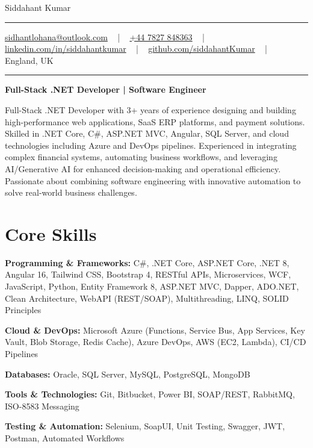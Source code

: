 \documentclass[letterpaper,10pt]{article}
\newcommand{\documentTitle}[2]{
  \begin{center}
    \vspace*{-0.3in}
    {\Huge\color{accentTitle} #1}
    \vspace{8pt}
    {\color{accentLine} \hrule}
    \vspace{2pt}
    \footnotesize{#2}
    \vspace{2pt}
    {\color{accentLine} \hrule}
  \end{center}
}
\newenvironment{resume_list}{
  \vspace{-7pt}
  \begin{itemize}[itemsep=-2px, parsep=1pt, leftmargin=30pt]
}{
  \end{itemize}
}
\begin{document}
\documentTitle{Siddahant Kumar}{
\vspace{0.1cm}
\href{mailto:sidhantlohana@outlook.com}{sidhantlohana@outlook.com} ~ | ~
\href{tel:+447827848363}{+44 7827 848363} ~ | ~
\href{https://www.linkedin.com/in/siddahantkumar/}{linkedin.com/in/siddahantkumar} ~ | ~
\href{https://github.com/siddahantKumar}{github.com/siddahantKumar} ~ | ~
England, UK
}

\begin{center}
\textbf{Full-Stack .NET Developer | Software Engineer}
\end{center}

Full-Stack .NET Developer with 3+ years of experience designing and building high-performance web applications, SaaS ERP platforms, and payment solutions. Skilled in .NET Core, C\#, ASP.NET MVC, Angular, SQL Server, and cloud technologies including Azure and DevOps pipelines. Experienced in integrating complex financial systems, automating business workflows, and leveraging AI/Generative AI for enhanced decision-making and operational efficiency. Passionate about combining software engineering with innovative automation to solve real-world business challenges.


\section{Core Skills}

\begin{resume_list}
    \item \textbf{Programming \& Frameworks:} C\#, .NET Core, ASP.NET Core, .NET 8, Angular 16, Tailwind CSS, Bootstrap 4, RESTful APIs, Microservices, WCF, JavaScript, Python, Entity Framework 8, ASP.NET MVC, Dapper, ADO.NET, Clean Architecture, WebAPI (REST/SOAP), Multithreading, LINQ, SOLID Principles
    \item \textbf{Cloud \& DevOps:} Microsoft Azure (Functions, Service Bus, App Services, Key Vault, Blob Storage, Redis Cache), Azure DevOps, AWS (EC2, Lambda), CI/CD Pipelines
    \item \textbf{Databases:} Oracle, SQL Server, MySQL, PostgreSQL, MongoDB
    \item \textbf{Tools \& Technologies:} Git, Bitbucket, Power BI, SOAP/REST, RabbitMQ, ISO-8583 Messaging
    \item \textbf{Testing \& Automation:} Selenium, SoapUI, Unit Testing, Swagger, JWT, Postman, Automated Workflows
\end{resume_list}
\end{document}
